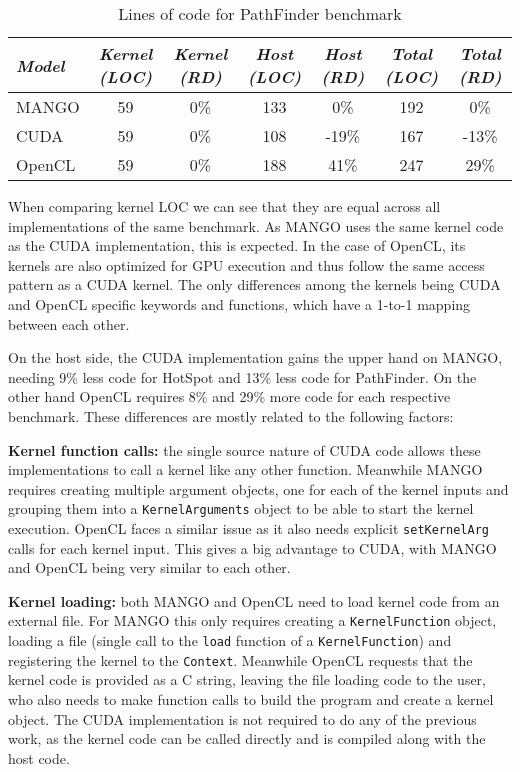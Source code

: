 \begin{table}
    \centering
    \begin{tabular}{l|c|c|c|c|c|c}
    \textit{Model} & \textit{Kernel (LOC)} & \textit{Kernel (RD)} & \textit{Host (LOC)} & \textit{Host (RD)} & \textit{Total (LOC)} & \textit{Total (RD)} \\ \hline
    MANGO & 59 & 0\% & 133 & 0\% & 192 & 0\% \\
    CUDA & 59 & 0\% & 108 & -19\% & 167 & -13\% \\
    OpenCL & 59 & 0\% & 188 & 41\% & 247 & 29\%  
    \end{tabular}
    \captionsetup{justification=centering}
    \caption{Lines of code for PathFinder benchmark}
    \label{tab:pathfinder-loc}
\end{table}

When comparing kernel LOC we can see that they are equal across all implementations of the same benchmark. As MANGO uses the same kernel code as the CUDA implementation, this is expected. In the case of OpenCL, its kernels are also optimized for GPU execution and thus follow the same access pattern as a CUDA kernel. The only differences among the kernels being CUDA and OpenCL specific keywords and functions, which have a 1-to-1 mapping between each other.

On the host side, the CUDA implementation gains the upper hand on MANGO, needing 9\% less code for HotSpot and 13\% less code for PathFinder. On the other hand OpenCL requires 8\% and 29\% more code for each respective benchmark. These differences are mostly related to the following factors:

\textbf{Kernel function calls:} the single source nature of CUDA code allows these implementations to call a kernel like any other function. Meanwhile MANGO requires creating multiple argument objects, one for each of the kernel inputs and grouping them into a \texttt{KernelArguments} object to be able to start the kernel execution. OpenCL faces a similar issue as it also needs explicit \texttt{setKernelArg} calls for each kernel input. This gives a big advantage to CUDA, with MANGO and OpenCL being very similar to each other.

\textbf{Kernel loading:} both MANGO and OpenCL need to load kernel code from an external file. For MANGO this only requires creating a \texttt{KernelFunction} object, loading a file (single call to the \texttt{load} function of a \texttt{KernelFunction}) and registering the kernel to the \texttt{Context}. Meanwhile OpenCL requests that the kernel code is provided as a C string, leaving the file loading code to the user, who also needs to make function calls to build the program and create a kernel object. The CUDA implementation is not required to do any of the previous work, as the kernel code can be called directly and is compiled along with the host code.

